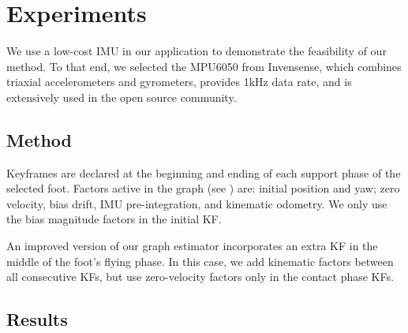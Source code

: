 
\section{Experiments} \label{sec:experiments}


We use a low-cost IMU in our application to demonstrate the feasibility of our method. 
To that end, we selected the MPU6050 from Invensense, which combines triaxial accelerometers and gyrometers, provides 1kHz data rate, and is extensively used in the open source community.

\subsection{Method}


Keyframes are declared at the beginning and ending of each support phase of the selected foot. Factors active in the graph (see ) are: initial position and yaw; zero velocity, bias drift, IMU pre-integration, and kinematic odometry. We only use the bias magnitude factors in the initial KF.

An improved version of our graph estimator incorporates an extra KF in the middle of the foot's flying phase. In this case, we add kinematic factors between all consecutive KFs, but use zero-velocity factors only in the contact phase KFs.

%

\subsection{Results}
